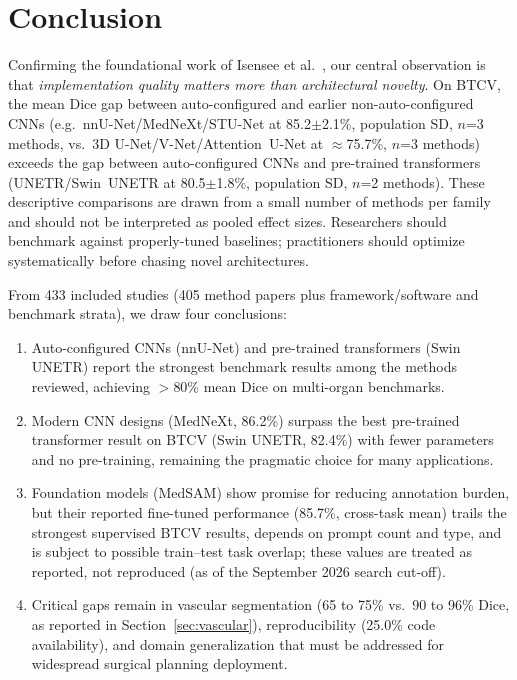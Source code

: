 
\section{Conclusion}
\label{sec:conclusion}

Confirming the foundational work of Isensee et al.~\cite{isensee2021nnunet}, our central observation is that \emph{implementation quality matters more than architectural novelty}. On BTCV, the mean Dice gap between auto-configured and earlier non-auto-configured CNNs (e.g.\ nnU-Net/MedNeXt/STU-Net at 85.2$\pm$2.1\%, population SD, $n$=3 methods, vs.\ 3D U-Net/V-Net/Attention~U-Net at $\approx$75.7\%, $n$=3 methods) exceeds the gap between auto-configured CNNs and pre-trained transformers (UNETR/Swin~UNETR at 80.5$\pm$1.8\%, population SD, $n$=2 methods). These descriptive comparisons are drawn from a small number of methods per family and should not be interpreted as pooled effect sizes. Researchers should benchmark against properly-tuned baselines; practitioners should optimize systematically before chasing novel architectures.

From 433 included studies (405 method papers plus framework/software and benchmark strata), we draw four conclusions:

\begin{enumerate}
    \item Auto-configured CNNs (nnU-Net) and pre-trained transformers (Swin UNETR) report the strongest benchmark results among the methods reviewed, achieving $>$80\% mean Dice on multi-organ benchmarks.
    
    \item Modern CNN designs (MedNeXt, 86.2\%) surpass the best pre-trained transformer result on BTCV (Swin UNETR, 82.4\%) with fewer parameters and no pre-training, remaining the pragmatic choice for many applications.
    
    \item Foundation models (MedSAM) show promise for reducing annotation burden, but their reported fine-tuned performance (85.7\%, cross-task mean) trails the strongest supervised BTCV results, depends on prompt count and type, and is subject to possible train--test task overlap; these values are treated as reported, not reproduced (as of the September 2026 search cut-off).
    
    \item Critical gaps remain in vascular segmentation (65 to 75\% vs.\ 90 to 96\% Dice, as reported in Section~\ref{sec:vascular}), reproducibility (25.0\% code availability), and domain generalization that must be addressed for widespread surgical planning deployment.
\end{enumerate}


